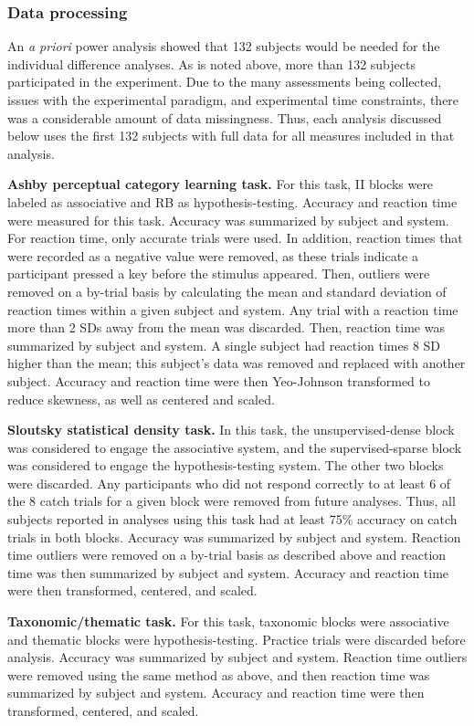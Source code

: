 \documentclass[../dissertation.tex]{subfiles}
\begin{document}
\subsubsection{Data processing}
	An \textit{a priori} power analysis showed that 132 subjects would be needed for the individual difference analyses. As is noted above, more than 132 subjects participated in the experiment. Due to the many assessments being collected, issues with the experimental paradigm, and experimental time constraints, there was a considerable amount of data missingness. Thus, each analysis discussed below uses the first 132 subjects with full data for all measures included in that analysis. \par
	\textbf{Ashby perceptual category learning task.} For this task, II blocks were labeled as associative and RB as hypothesis-testing. Accuracy and reaction time were measured for this task. Accuracy was summarized by subject and system. For reaction time, only accurate trials were used. In addition, reaction times that were recorded as a negative value were removed, as these trials indicate a participant pressed a key before the stimulus appeared. Then, outliers were removed on a by-trial basis by calculating the mean and standard deviation of reaction times within a given subject and system. Any trial with a reaction time more than 2 SDs away from the mean was discarded. Then, reaction time was summarized by subject and system. A single subject had reaction times 8 SD higher than the mean; this subject's data was removed and replaced with another subject. Accuracy and reaction time were then Yeo-Johnson transformed to reduce skewness, as well as centered and scaled. \par
	\textbf{Sloutsky statistical density task.} In this task, the unsupervised-dense block was considered to engage the associative system, and the supervised-sparse block was considered to engage the hypothesis-testing system. The other two blocks were discarded. Any participants who did not respond correctly to at least 6 of the 8 catch trials for a given block were removed from future analyses. Thus, all subjects reported in analyses using this task had at least 75\% accuracy on catch trials in both blocks. Accuracy was summarized by subject and system. Reaction time outliers were removed on a by-trial basis as described above and reaction time was then summarized by subject and system. Accuracy and reaction time were then transformed, centered, and scaled. \par
	\textbf{Taxonomic/thematic task.} For this task, taxonomic blocks were associative and thematic blocks were hypothesis-testing. Practice trials were discarded before analysis. Accuracy was summarized by subject and system. Reaction time outliers were removed using the same method as above, and then reaction time was summarized by subject and system. Accuracy and reaction time were then transformed, centered, and scaled. \par
\end{document}
